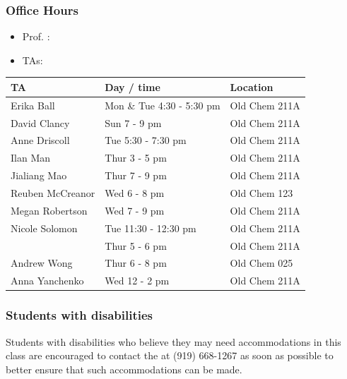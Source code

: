 \documentclass[11pt,containsverbatim,handout,xcolor=xelatex,dvipsnames,table]{beamer}
\begin{document}
\begin{frame}
\frametitle{Office Hours}

\begin{itemize}
\item Prof. \LastName{}: \OfficeHours{}
\item TAs: 
\end{itemize}
{\small
{}
\begin{tabular}{l | l | l}
TA				& Day / time						& Location \\
\hline
Erika Ball			& Mon \& Tue 4:30 - 5:30 pm			& Old Chem 211A \\
David Clancy		& Sun 7 - 9 pm						& Old Chem 211A \\
Anne Driscoll		& Tue 5:30 - 7:30 pm					& Old Chem 211A \\
Ilan Man			& Thur 3 - 5 pm						& Old Chem 211A \\
Jialiang Mao		& Thur 7 - 9 pm						& Old Chem 211A \\
Reuben McCreanor	& Wed 6 - 8 pm						& Old Chem 123 \\
Megan Robertson	& Wed 7 - 9 pm						& Old Chem 211A \\
Nicole Solomon		& Tue 11:30 - 12:30 pm 				& Old Chem 211A \\
				& Thur 5 - 6 pm						& Old Chem 211A \\
Andrew Wong		& Thur 6 - 8 pm						& Old Chem 025 \\
Anna Yanchenko	& Wed 12 - 2 pm					& Old Chem 211A \\
\end{tabular}
}

\end{frame}


\begin{frame}
\frametitle{Students with disabilities}

Students with disabilities who believe they may need accommodations in this class are 
encouraged to contact the 
 at (919) 668-1267 as soon as possible to better ensure that such 
accommodations can be made.

\vfill



\end{frame}
\end{document}

